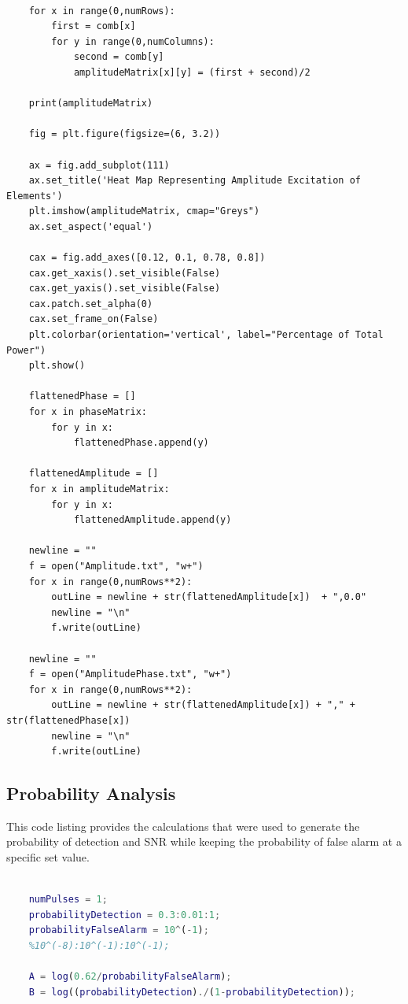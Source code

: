 \documentclass[11pt]{witseiepaper}
\begin{document}
\begin{bibunit}[witseie]
\begin{lstlisting}[breaklines=true, postbreak=\mbox{\textcolor{red}{$\hookrightarrow$}\space}]
    
    for x in range(0,numRows):
        first = comb[x]
        for y in range(0,numColumns):
            second = comb[y]
            amplitudeMatrix[x][y] = (first + second)/2
    
    print(amplitudeMatrix)
    
    fig = plt.figure(figsize=(6, 3.2))
    
    ax = fig.add_subplot(111)
    ax.set_title('Heat Map Representing Amplitude Excitation of Elements')
    plt.imshow(amplitudeMatrix, cmap="Greys")
    ax.set_aspect('equal')
    
    cax = fig.add_axes([0.12, 0.1, 0.78, 0.8])
    cax.get_xaxis().set_visible(False)
    cax.get_yaxis().set_visible(False)
    cax.patch.set_alpha(0)
    cax.set_frame_on(False)
    plt.colorbar(orientation='vertical', label="Percentage of Total Power")
    plt.show()
    
    flattenedPhase = []
    for x in phaseMatrix:
        for y in x:
            flattenedPhase.append(y)
    
    flattenedAmplitude = []
    for x in amplitudeMatrix:
        for y in x:
            flattenedAmplitude.append(y)
    
    newline = ""
    f = open("Amplitude.txt", "w+")
    for x in range(0,numRows**2):
        outLine = newline + str(flattenedAmplitude[x])  + ",0.0"
        newline = "\n"
        f.write(outLine)
    
    newline = ""
    f = open("AmplitudePhase.txt", "w+")
    for x in range(0,numRows**2):
        outLine = newline + str(flattenedAmplitude[x]) + "," + str(flattenedPhase[x])
        newline = "\n"
        f.write(outLine)
\end{lstlisting}

\subsection{Probability Analysis} \label{sec:ProbabilityAnalysis}
This code listing provides the calculations that were used to generate the probability of detection and SNR while keeping the probability of false alarm at a specific set value. 
\begin{lstlisting}[language=matlab, breaklines=true, postbreak=\mbox{\textcolor{red}{$\hookrightarrow$}\space}]

    numPulses = 1;
    probabilityDetection = 0.3:0.01:1;
    probabilityFalseAlarm = 10^(-1);
    %10^(-8):10^(-1):10^(-1);
    
    A = log(0.62/probabilityFalseAlarm);
    B = log((probabilityDetection)./(1-probabilityDetection));
    

\end{lstlisting}
\end{bibunit}
\end{document}
